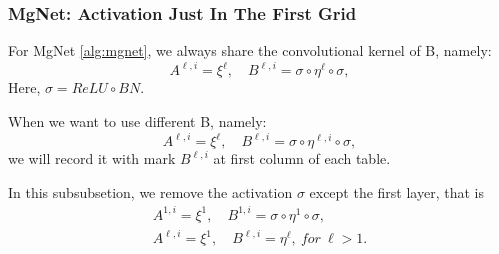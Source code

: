 \begin{table}[!htbp]
	\caption{algorithm \ref{two stage training 2}: $J=1,\nu_1=2,c_u^1=c_f^1=8$,case4: with trainable layer}
	\label{one conv with stride 2}
	\begin{center}
	\end{center}
\end{table}


\subsubsection{MgNet: Activation Just In The First Grid}
For MgNet \ref{alg:mgnet}, we always share the convolutional kernel of B, namely:
\begin{equation}
A^{\ell,i} = \xi^{\ell}, \quad B^{\ell,i} = \sigma \circ  \eta^{\ell} \circ \sigma ,
\end{equation} 
Here, $\sigma=ReLU \circ BN$.

When we want to use different B, namely:
\begin{equation}
A^{\ell,i} = \xi^{\ell}, \quad B^{\ell,i} = \sigma \circ  \eta^{\ell,i} \circ \sigma ,
\end{equation} 
we will record it with mark $B^{\ell,i}$ at first column of each table.

In this subsubsetion, we remove the activation $\sigma$ except the first layer, that is 
\begin{equation}
\begin{split}
A^{1,i} = \xi^{1}, \quad B^{1,i} = \sigma \circ  \eta^{1} \circ \sigma , \\
A^{\ell,i} = \xi^{1}, \quad B^{\ell,i} =   \eta^{\ell} ,\ for \ \ell > 1 .
\end{split}
\end{equation}


